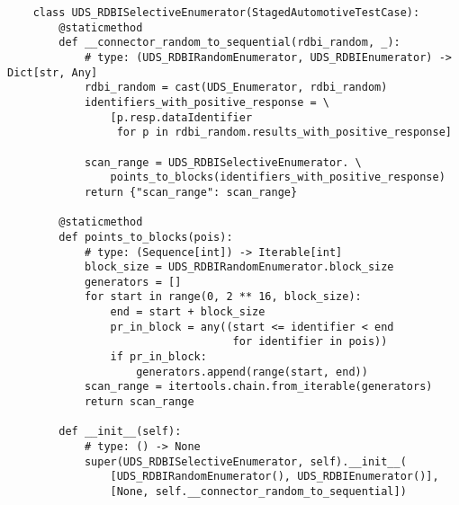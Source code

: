 \begin{verbatim}
    class UDS_RDBISelectiveEnumerator(StagedAutomotiveTestCase):
        @staticmethod
        def __connector_random_to_sequential(rdbi_random, _):
            # type: (UDS_RDBIRandomEnumerator, UDS_RDBIEnumerator) -> Dict[str, Any]
            rdbi_random = cast(UDS_Enumerator, rdbi_random)
            identifiers_with_positive_response = \
                [p.resp.dataIdentifier
                 for p in rdbi_random.results_with_positive_response]
    
            scan_range = UDS_RDBISelectiveEnumerator. \
                points_to_blocks(identifiers_with_positive_response)
            return {"scan_range": scan_range}
    
        @staticmethod
        def points_to_blocks(pois):
            # type: (Sequence[int]) -> Iterable[int]
            block_size = UDS_RDBIRandomEnumerator.block_size
            generators = []
            for start in range(0, 2 ** 16, block_size):
                end = start + block_size
                pr_in_block = any((start <= identifier < end
                                   for identifier in pois))
                if pr_in_block:
                    generators.append(range(start, end))
            scan_range = itertools.chain.from_iterable(generators)
            return scan_range
    
        def __init__(self):
            # type: () -> None
            super(UDS_RDBISelectiveEnumerator, self).__init__(
                [UDS_RDBIRandomEnumerator(), UDS_RDBIEnumerator()],
                [None, self.__connector_random_to_sequential])
\end{verbatim}

